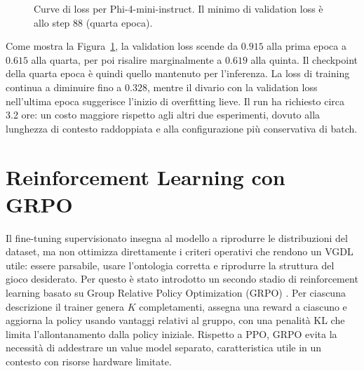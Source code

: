 \documentclass[final,5p,times,twocolumn]{elsarticle}
\begin{document}
\begin{figure}[t]
  \centering
  \caption{Curve di loss per Phi-4-mini-instruct. Il minimo di validation loss è allo step 88 (quarta epoca).}
  \label{fig:phi4_loss}
\end{figure}

Come mostra la Figura~\ref{fig:phi4_loss}, la validation loss scende da $0.915$ alla prima epoca a $0.615$ alla quarta, per poi risalire marginalmente a $0.619$ alla quinta. Il checkpoint della quarta epoca è quindi quello mantenuto per l'inferenza. La loss di training continua a diminuire fino a $0.328$, mentre il divario con la validation loss nell'ultima epoca suggerisce l'inizio di overfitting lieve. Il run ha richiesto circa 3.2 ore: un costo maggiore rispetto agli altri due esperimenti, dovuto alla lunghezza di contesto raddoppiata e alla configurazione più conservativa di batch.

\section{Reinforcement Learning con GRPO}

Il fine-tuning supervisionato insegna al modello a riprodurre le distribuzioni del dataset, ma non ottimizza direttamente i criteri operativi che rendono un VGDL utile: essere parsabile, usare l'ontologia corretta e riprodurre la struttura del gioco desiderato. Per questo è stato introdotto un secondo stadio di reinforcement learning basato su Group Relative Policy Optimization (GRPO) \citep{shao2024deepseekmath}. Per ciascuna descrizione il trainer genera $K$ completamenti, assegna una reward a ciascuno e aggiorna la policy usando vantaggi relativi al gruppo, con una penalità KL che limita l'allontanamento dalla policy iniziale. Rispetto a PPO, GRPO evita la necessità di addestrare un value model separato, caratteristica utile in un contesto con risorse hardware limitate.
\end{document}
